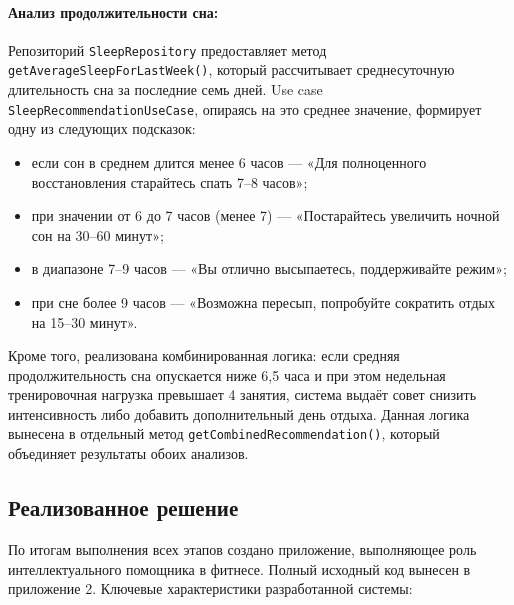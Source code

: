 \paragraph{Анализ продолжительности сна:}
Репозиторий \texttt{SleepRepository} предоставляет метод \texttt{getAverageSleepForLastWeek()}, который рассчитывает среднесуточную длительность сна за последние семь дней. Use case \texttt{SleepRecommendationUseCase}, опираясь на это среднее значение, формирует одну из следующих подсказок:
\begin{itemize}
    \item если сон в среднем длится менее 6 часов — «Для полноценного восстановления старайтесь спать 7–8 часов»;
    \item при значении от 6 до 7 часов (менее 7) — «Постарайтесь увеличить ночной сон на 30–60 минут»;
    \item в диапазоне 7–9 часов — «Вы отлично высыпаетесь, поддерживайте режим»;
    \item при сне более 9 часов — «Возможна пересып, попробуйте сократить отдых на 15–30 минут».
\end{itemize}
Кроме того, реализована комбинированная логика: если средняя продолжительность сна опускается ниже 6,5 часа и при этом недельная тренировочная нагрузка превышает 4 занятия, система выдаёт совет снизить интенсивность либо добавить дополнительный день отдыха. Данная логика вынесена в отдельный метод \texttt{getCombinedRecommendation()}, который объединяет результаты обоих анализов.

\subsection{Реализованное решение}

По итогам выполнения всех этапов создано приложение, выполняющее роль интеллектуального помощника в фитнесе. Полный исходный код вынесен в приложение 2. Ключевые характеристики разработанной системы:

